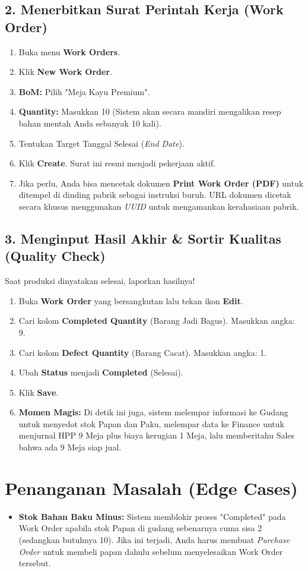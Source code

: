 \subsection{2. Menerbitkan Surat Perintah Kerja (Work Order)}
\begin{enumerate}
    \item Buka menu \textbf{Work Orders}.
    \item Klik \textbf{New Work Order}.
    \item \textbf{BoM:} Pilih "Meja Kayu Premium".
    \item \textbf{Quantity:} Masukkan 10 (Sistem akan secara mandiri mengalikan resep bahan mentah Anda sebanyak 10 kali).
    \item Tentukan Target Tanggal Selesai (\textit{End Date}).
    \item Klik \textbf{Create}. Surat ini resmi menjadi pekerjaan aktif.
    \item Jika perlu, Anda bisa mencetak dokumen \textbf{Print Work Order (PDF)} untuk ditempel di dinding pabrik sebagai instruksi buruh. URL dokumen dicetak secara khusus menggunakan \textit{UUID} untuk mengamankan kerahasiaan pabrik.
\end{enumerate}

\subsection{3. Menginput Hasil Akhir \& Sortir Kualitas (Quality Check)}
Saat produksi dinyatakan selesai, laporkan hasilnya!
\begin{enumerate}
    \item Buka \textbf{Work Order} yang bersangkutan lalu tekan ikon \textbf{Edit}.
    \item Cari kolom \textbf{Completed Quantity} (Barang Jadi Bagus). Masukkan angka: 9.
    \item Cari kolom \textbf{Defect Quantity} (Barang Cacat). Masukkan angka: 1.
    \item Ubah \textbf{Status} menjadi \textbf{Completed} (Selesai).
    \item Klik \textbf{Save}. 
    \item \textbf{Momen Magis:} Di detik ini juga, sistem melempar informasi ke Gudang untuk menyedot stok Papan dan Paku, melempar data ke Finance untuk menjurnal HPP 9 Meja plus biaya kerugian 1 Meja, lalu memberitahu Sales bahwa ada 9 Meja siap jual.
\end{enumerate}

\section{Penanganan Masalah (Edge Cases)}
\begin{itemize}
    \item \textbf{Stok Bahan Baku Minus:} Sistem memblokir proses "Completed" pada Work Order apabila stok Papan di gudang sebenarnya cuma sisa 2 (sedangkan butuhnya 10). Jika ini terjadi, Anda harus membuat \textit{Purchase Order} untuk membeli papan dahulu sebelum menyelesaikan Work Order tersebut.
\end{itemize}
